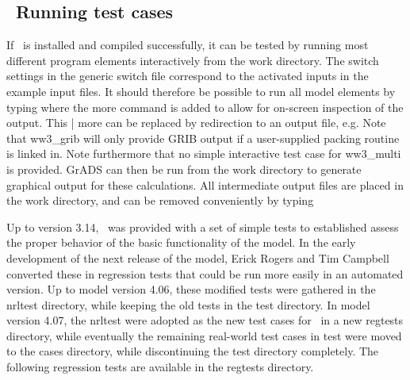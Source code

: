 \vssub
\subsection{~Running test cases} \label{sec:tests}
\vssub

If \ws\ is installed and compiled successfully, it can be tested by running
most different program elements interactively from the {\file work}
directory. The switch settings in the generic switch file correspond to the
activated inputs in the example input files. It should therefore be possible
to run all model elements by typing
where the {\code more} command is added to allow for on-screen inspection of
the output. This {\code | more} can be replaced by redirection to an output
file, e.g.  Note that {\code ww3\_grib}
will only provide GRIB output if a user-supplied packing routine is linked
in. Note furthermore that no simple interactive test case for {\file
ww3\_multi} is provided. GrADS can then be run from the work directory to
generate graphical output for these calculations. All intermediate output
files are placed in the {\file work} directory, and can be removed
conveniently by typing 

\vspace{\baselineskip} \noindent
Up to version 3.14, \ws\ was provided with a set of simple tests to
established assess the proper behavior of the basic functionality of the
model. In the early development of the next release of the model, Erick Rogers
and Tim Campbell converted these in regression tests that could be run more
easily in an automated version. Up to model version 4.06, these modified tests
were gathered in the {\file nrltest} directory, while keeping the old tests in
the {\file test} directory. In model version 4.07, the {\file nrltest} were
adopted as the new test cases for \ws\ in a new {\file regtests} directory,
while eventually the remaining real-world test cases in {\file test} were
moved to the {\file cases} directory, while discontinuing the {\file test}
directory completely. The following regression tests are available in the
{\file regtests} directory.

